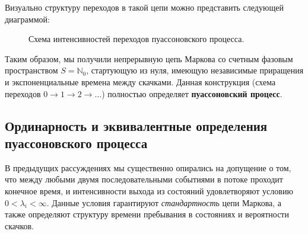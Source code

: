 Визуально структуру переходов в такой цепи можно представить следующей диаграммой:

\begin{figure}[h!]
    \centering
    \caption{Схема интенсивностей переходов пуассоновского процесса.}
\end{figure}

\begin{note}
Таким образом, мы получили непрерывную цепь Маркова со счетным фазовым пространством $S = \mathbb{N}_0$, стартующую из нуля, имеющую независимые приращения и экспоненциальные времена между скачками. Данная конструкция (схема переходов $0 \to 1 \to 2 \to \dots$) полностью определяет \textbf{пуассоновский процесс}.
\end{note}

\subsection{Ординарность и эквивалентные определения пуассоновского процесса}

В предыдущих рассуждениях мы существенно опирались на допущение о том, что между любыми двумя последовательными событиями в потоке проходит конечное время, и интенсивности выхода из состояний удовлетворяют условию $0 < \lambda_i < \infty$. Данные условия гарантируют \textit{стандартность} цепи Маркова, а также определяют структуру времени пребывания в состояниях и вероятности скачков.

